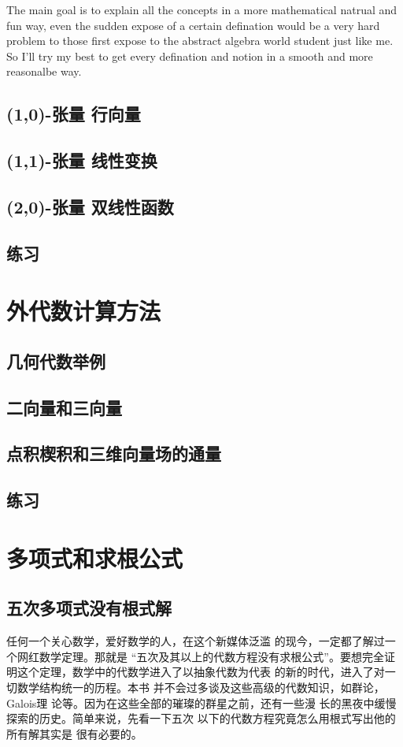 \documentclass{book}
\begin{document}
\begin{CJK}{UTF8}{gbsn}
    The main goal is to explain all the concepts in a
    more mathematical natrual and fun way, even the sudden
    expose of a certain defination would be a very hard
    problem to those first expose to the abstract algebra
    world student just like me. So I'll try my best to
    get every defination and notion in a smooth and more
    reasonalbe way.
    \subsection{(1,0)-张量 行向量}
    \subsection{(1,1)-张量 线性变换}
    \subsection{(2,0)-张量 双线性函数}
    \subsection{练习}
    \section{外代数计算方法}
    \subsection{几何代数举例}
    \subsection{二向量和三向量}
    \subsection{点积楔积和三维向量场的通量}
    \subsection{练习}
    \section{多项式和求根公式}
    \subsection{五次多项式没有根式解}
    任何一个关心数学，爱好数学的人，在这个新媒体泛滥
    的现今，一定都了解过一个网红数学定理。那就是
    “五次及其以上的代数方程没有求根公式”。要想完全证
    明这个定理，数学中的代数学进入了以抽象代数为代表
    的新的时代，进入了对一切数学结构统一的历程。本书
    并不会过多谈及这些高级的代数知识，如群论，Galois理
    论等。因为在这些全部的璀璨的群星之前，还有一些漫
    长的黑夜中缓慢探索的历史。简单来说，先看一下五次
    以下的代数方程究竟怎么用根式写出他的所有解其实是
    很有必要的。

\end{CJK}
\end{document}
